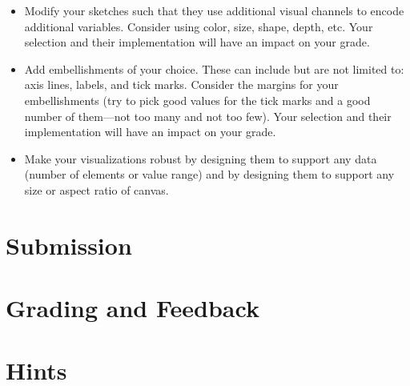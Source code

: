 \documentclass[a4paper,12pt]{article}
\begin{document}
\begin{itemize}
\item Modify your sketches such that they use additional visual channels to encode additional variables. Consider using color, size, shape, depth, etc. Your selection and their implementation will have an impact on your grade.

\item Add embellishments of your choice. These can include but are not limited to: axis lines, labels, and tick marks. Consider the margins for your embellishments (try to pick good values for the tick marks and a good number of them---not too many and not too few). Your selection and their implementation will have an impact on your grade.

\item Make your visualizations robust by designing them to support any data (number of elements or value range) and by designing them to support any size or aspect ratio of canvas.

\end{itemize}


\section{Submission}


\section{Grading and Feedback}

\feedback

\section{Hints}







\newpage
\end{document}
